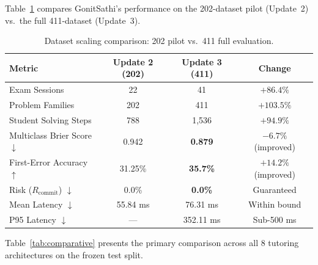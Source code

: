 \documentclass[lettersize,onecolumn,journal]{IEEEtran}
\begin{document}
\begin{itemize}
Table~\ref{tab:scaling} compares GonitSathi's performance on the 202-dataset pilot (Update~2) vs.\ the full 411-dataset (Update~3).

\begin{table}[H]
\centering
\caption{Dataset scaling comparison: 202 pilot vs.\ 411 full evaluation.}
\label{tab:scaling}
\renewcommand{\arraystretch}{1.2}
\small
\begin{tabular}{lccc}
\toprule
\textbf{Metric} & \textbf{Update 2 (202)} & \textbf{Update 3 (411)} & \textbf{Change} \\
\midrule
Exam Sessions & 22 & 41 & $+86.4\%$ \\
Problem Families & 202 & 411 & $+103.5\%$ \\
Student Solving Steps & 788 & 1{,}536 & $+94.9\%$ \\
\midrule
Multiclass Brier Score $\downarrow$ & 0.942 & \textbf{0.879} & $-6.7\%$ (improved) \\
First-Error Accuracy $\uparrow$ & 31.25\% & \textbf{35.7\%} & $+14.2\%$ (improved) \\
Risk ($R_{\text{commit}}$) $\downarrow$ & 0.0\% & \textbf{0.0\%} & Guaranteed \\
Mean Latency $\downarrow$ & 55.84 ms & 76.31 ms & Within bound \\
P95 Latency $\downarrow$ & --- & 352.11 ms & Sub-500 ms \\
\bottomrule
\end{tabular}
\end{table}

Table~\ref{tab:comparative} presents the primary comparison across all 8 tutoring architectures on the frozen test split.


\end{itemize}
\end{document}
